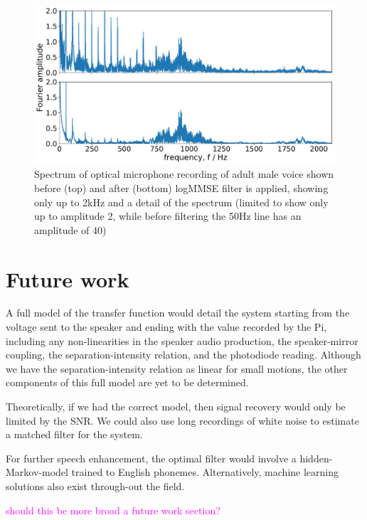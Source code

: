 \documentclass[prb,preprint]{revtex4-1}
\newcommand{\jam}{\textcolor{magenta}}
\begin{document}
\begin{figure}%
	\includegraphics[width=\textwidth]{figures/filter_spectrum_aa_melatos-cropped.pdf}
	\caption{Spectrum of optical microphone recording of adult male voice shown before (top) and after (bottom) logMMSE filter is applied, showing only up to 2kHz and a detail of the spectrum (limited to show only up to amplitude 2, while before filtering the 50Hz line has an amplitude of 40)}
	\label{fig:logMMSE_spectrum}
\end{figure}


\section{Future work}

A full model of the transfer function would detail the system starting from the voltage sent to the speaker and ending with the value recorded by the Pi, including any non-linearities in the speaker audio production, the speaker-mirror coupling, the separation-intensity relation, and the photodiode reading. Although we have the separation-intensity relation as linear for small motions, the other components of this full model are yet to be determined.


Theoretically, if we had the correct model, then signal recovery would only be limited by the SNR. We could also use long recordings of white noise to estimate a matched filter for the system.


For further speech enhancement, the optimal filter would involve a hidden-Markov-model trained to English phonemes. Alternatively, machine learning solutions also exist through-out the field.


\jam{should this be more broad a future work section?}
\end{document}
